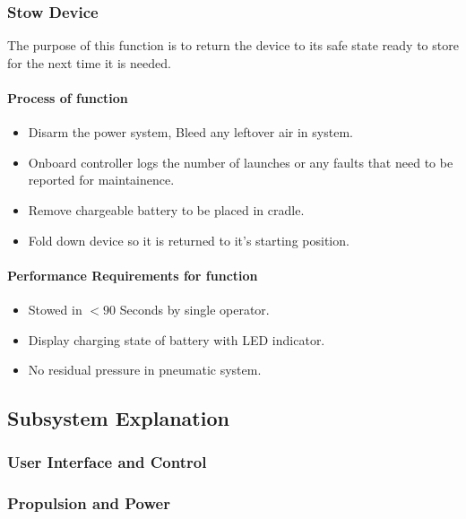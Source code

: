 \documentclass[a4paper,10pt]{article} %
\begin{document}
\subsubsection{Stow Device}

The purpose of this function is to return the device to its safe state ready to store for the next time it is needed.

\paragraph{Process of function}


\begin{itemize}
    \item Disarm the power system, Bleed any leftover air in system.
    \item Onboard controller logs the number of launches or any faults that need to be reported for maintainence.
    \item Remove chargeable battery to be placed in cradle.
    \item Fold down device so it is returned to it's starting position.
\end{itemize}

\paragraph{Performance Requirements for function}

\begin{itemize}
    \item Stowed in $<90$ Seconds by single operator.
    \item Display charging state of battery with LED indicator.
    \item No residual pressure in pneumatic system.
\end{itemize}


\newpage

\subsection{Subsystem Explanation}

\subsubsection{User Interface and Control}

\subsubsection{Propulsion and Power}
\end{document}
